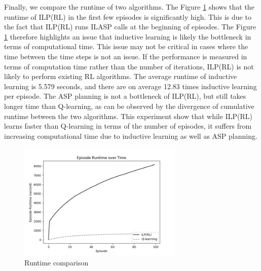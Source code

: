 Finally, we compare the runtime of two algorithms. 
The Figure \ref{exp1_runtime} shows that the runtime of ILP(RL) in the first few episodes is significantly high. 
This is due to the fact that ILP(RL) runs ILASP calls at the beginning of episodes.
The Figure \ref{exp1_runtime} therefore highlights an issue that inductive learning is likely the bottleneck in terms of computational time.
This issue may not be critical in cases where the time between the time steps is not an issue. If the performance is measured in terms of computation time rather than the number of iterations, 
ILP(RL) is not likely to perform existing RL algorithms. 
The average runtime of inductive learning is 5.579 seconds, and there are on average 12.83 times inductive learning per episode. 
The ASP planning is not a bottleneck of ILP(RL), but still takes longer time than Q-learning, as can be observed by the divergence of cumulative runtime between the two algorithms. 
This experiment show that while ILP(RL) learns faster than Q-learning in terms of the number of episodes, it suffers from increasing computational time due to inductive learning as well as ASP planning.

\begin{figure}[!htb]
\centering
\includegraphics[width=0.7\textwidth]{./figures/experiment1_runtime}
\caption{Runtime comparison}
\label{exp1_runtime}
\end{figure}


